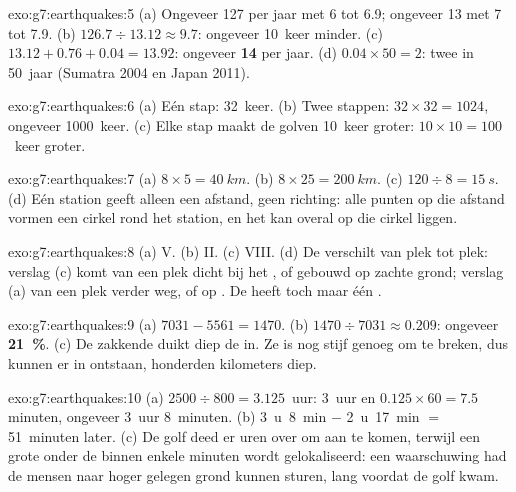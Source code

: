 \begin{solution}{exo:g7:earthquakes:5}
(a) Ongeveer 127 per jaar met  6 tot 6.9; ongeveer 13 met
 7 tot 7.9. (b) $126.7 \div 13.12 \approx 9.7$: ongeveer 10~keer
minder. (c) $13.12 + 0.76 + 0.04 = 13.92$: ongeveer \textbf{14} per jaar.
(d) $0.04 \times 50 = 2$: twee in 50~jaar (Sumatra 2004 en Japan 2011).
\end{solution}

\begin{solution}{exo:g7:earthquakes:6}
(a) Eén stap: 32~keer. (b) Twee stappen: $32 \times 32 = 1024$, ongeveer
1000~keer. (c) Elke stap maakt de golven 10~keer groter: $10 \times 10 =
100$~keer groter.
\end{solution}

\begin{solution}{exo:g7:earthquakes:7}
(a) $8 \times 5 = \qty{40}{km}$. (b) $8 \times 25 = \qty{200}{km}$. (c)
$120 \div 8 = \qty{15}{s}$. (d) Eén station geeft alleen een afstand, geen
richting: alle punten op die afstand vormen een cirkel rond het station,
en het  kan overal op die cirkel liggen.
\end{solution}

\begin{solution}{exo:g7:earthquakes:8}
(a) V. (b) II. (c) VIII. (d) De  verschilt van plek tot plek:
verslag (c) komt van een plek dicht bij het , of gebouwd op
zachte grond; verslag (a) van een plek verder weg, of op . De
 heeft toch maar één .
\end{solution}

\begin{solution}{exo:g7:earthquakes:9}
(a) $7031 - 5561 = 1470$. (b) $1470 \div 7031 \approx 0.209$: ongeveer
\textbf{21~\%}. (c) De zakkende  duikt diep de  in. Ze is nog
stijf genoeg om te breken, dus kunnen er  in ontstaan,
honderden kilometers diep.
\end{solution}

\begin{solution}{exo:g7:earthquakes:10}
(a) $2500 \div 800 = 3.125$~uur: 3~uur en $0.125 \times 60 = 7.5$
minuten, ongeveer 3~uur 8~minuten. (b) 3~u~8~min $-$ 2~u~17~min $=$
51~minuten later. (c) De golf deed er uren over om aan te komen, terwijl
een grote  onder de  binnen enkele minuten wordt
gelokaliseerd: een waarschuwing had de mensen naar hoger gelegen grond
kunnen sturen, lang voordat de golf kwam.
\end{solution}

